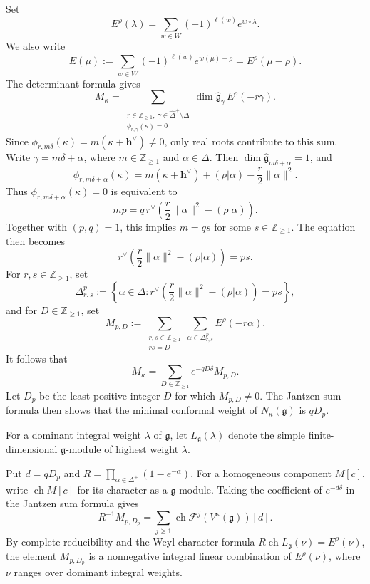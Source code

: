 \documentclass[11pt,a4paper]{amsart}
\newcommand{\ZZ}{\mathbb Z}
\theoremstyle{plain}
\numberwithin{equation}{section}
\def \g{\mathfrak g}
\begin{document}
Set
\[
E^\rho(\lambda)
=\sum_{w\in W}(-1)^{\ell(w)}e^{w\circ\lambda}.
\]
We also write
\[
E(\mu)
:=\sum_{w\in W}(-1)^{\ell(w)}e^{w(\mu)-\rho}
=E^\rho(\mu-\rho).
\]
The determinant formula \cite{GK07} gives
\[
M_\kappa
=\sum_{\substack{
r\in\ZZ_{\ge1},\
\gamma\in\widehat\Delta^+\setminus\Delta\\
\phi_{r,\gamma}(\kappa)=0}}
\dim\widehat{\mathfrak g}_\gamma\,E^\rho(-r\gamma).
\]
Since \(\phi_{r,m\delta}(\kappa)=m(\kappa+\mathbf{h}^\vee)\ne0\),
only real roots contribute to this sum.
Write \(\gamma=m\delta+\alpha\), where
\(m\in\ZZ_{\ge1}\) and \(\alpha\in\Delta\).
Then \(\dim\widehat{\mathfrak g}_{m\delta+\alpha}=1\), and
\[
\phi_{r,m\delta+\alpha}(\kappa)
=m(\kappa+\mathbf{h}^\vee)+(\rho|\alpha)
-\frac r2\|\alpha\|^2.
\]
Thus \(\phi_{r,m\delta+\alpha}(\kappa)=0\) is equivalent to
\[
mp
=q\,r^\vee\left(\frac r2\|\alpha\|^2-(\rho|\alpha)\right).
\]
Together with \((p,q)=1\), this implies \(m=qs\) for some
\(s\in\ZZ_{\ge1}\).
The equation then becomes
\[
r^\vee\left(\frac r2\|\alpha\|^2-(\rho|\alpha)\right)=ps.
\]
For \(r,s\in\ZZ_{\ge1}\), set
\begin{equation}\label{3ce1}
\Delta_{r,s}^p
:=\left\{\alpha\in\Delta:
r^\vee\left(\frac r2\|\alpha\|^2-(\rho|\alpha)\right)=ps
\right\},
\end{equation}
and for \(D\in\ZZ_{\ge1}\), set
\[
M_{p,D}
:=\sum_{\substack{r,s\in\ZZ_{\ge1}\\rs=D}}
\sum_{\alpha\in\Delta_{r,s}^p}E^\rho(-r\alpha).
\]
It follows that
\[
M_\kappa
=\sum_{D\in\ZZ_{\ge1}}e^{-qD\delta}M_{p,D}.
\]
Let \(D_p\) be the least positive integer \(D\) for which
\(M_{p,D}\ne0\).
The Jantzen sum formula then shows that the minimal conformal
weight of \(N_\kappa(\mathfrak g)\) is \(qD_p\).

For a dominant integral weight \(\lambda\) of $\g$, let
\(L_{\mathfrak g}(\lambda)\) denote the simple finite-dimensional
\(\mathfrak g\)-module of highest weight \(\lambda\).

Put \(d=qD_p\) and
\(R=\prod_{\alpha\in\Delta^+}(1-e^{-\alpha})\).
For a homogeneous component \(M[c]\), write
\(\operatorname{ch}M[c]\) for its character as a \(\mathfrak g\)-module.
Taking the coefficient of \(e^{-d\delta}\) in the Jantzen sum
formula gives
\begin{equation}\label{eq:first-coefficient-positivity}
R^{-1}M_{p,D_p}
=\sum_{j\ge1}
\operatorname{ch}\mathcal F^j(V^\kappa(\mathfrak g))[d].
\end{equation}
By complete reducibility and the Weyl character formula
\(R\operatorname{ch}L_{\mathfrak g}(\nu)=E^\rho(\nu)\), the element
\(M_{p,D_p}\) is a nonnegative integral linear combination of
\(E^\rho(\nu)\), where \(\nu\) ranges over dominant integral weights.
\end{document}
